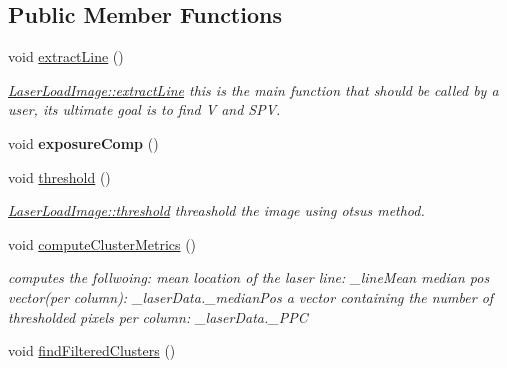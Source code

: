 \subsection*{Public Member Functions}
\begin{DoxyCompactItemize}
\item 
void \hyperlink{classLaserLoadImage_ad69e4575ad9c23a50e9a9003da3c23c4}{extract\+Line} ()\hypertarget{classLaserLoadImage_ad69e4575ad9c23a50e9a9003da3c23c4}{}\label{classLaserLoadImage_ad69e4575ad9c23a50e9a9003da3c23c4}

\begin{DoxyCompactList}\small\item\em \hyperlink{classLaserLoadImage_ad69e4575ad9c23a50e9a9003da3c23c4}{Laser\+Load\+Image\+::extract\+Line} this is the main function that should be called by a user, its ultimate goal is to find V and S\+PV. \end{DoxyCompactList}\item 
void {\bfseries exposure\+Comp} ()\hypertarget{classLaserLoadImage_a128ae8a030aab7de5624c9dbc95138bb}{}\label{classLaserLoadImage_a128ae8a030aab7de5624c9dbc95138bb}

\item 
void \hyperlink{classLaserLoadImage_afaf089991d1c4c7292485a3775293c44}{threshold} ()
\begin{DoxyCompactList}\small\item\em \hyperlink{classLaserLoadImage_afaf089991d1c4c7292485a3775293c44}{Laser\+Load\+Image\+::threshold} threashold the image using otsu\textquotesingle{}s method. \end{DoxyCompactList}\item 
void \hyperlink{classLaserLoadImage_ae86bd81ae6b5aaaf2dd0ef524a2f75f0}{compute\+Cluster\+Metrics} ()\hypertarget{classLaserLoadImage_ae86bd81ae6b5aaaf2dd0ef524a2f75f0}{}\label{classLaserLoadImage_ae86bd81ae6b5aaaf2dd0ef524a2f75f0}

\begin{DoxyCompactList}\small\item\em computes the follwoing\+: mean location of the laser line\+: \+\_\+line\+Mean median pos vector(per column)\+: \+\_\+laser\+Data.\+\_\+median\+Pos a vector containing the number of thresholded pixels per column\+: \+\_\+laser\+Data.\+\_\+\+P\+PC \end{DoxyCompactList}\item 
void \hyperlink{classLaserLoadImage_a552e5903040d7216fe002af7780e558e}{find\+Filtered\+Clusters} ()\hypertarget{classLaserLoadImage_a552e5903040d7216fe002af7780e558e}{}\label{classLaserLoadImage_a552e5903040d7216fe002af7780e558e}


\end{DoxyCompactItemize}
